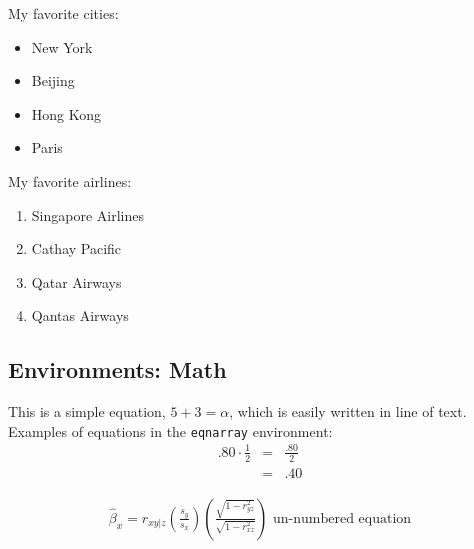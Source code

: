 \documentclass[10pt]{article}
\begin{document}
\noindent My favorite cities:
\begin{itemize}
\item New York
\item Beijing
\item Hong Kong
\item Paris
\end{itemize}

\noindent My favorite airlines:
\begin{enumerate}
\item Singapore Airlines
\item Cathay Pacific
\item Qatar Airways
\item Qantas Airways
\end{enumerate}

\subsection*{Environments: Math}

This is a simple equation, $5 + 3 = \alpha$, which is easily written in line of text. \\

\noindent Examples of equations in the {\tt eqnarray} environment:
\begin{eqnarray}
.80 \cdot \frac{1}{2} & = & \frac{.80}{2} \\
& = & .40
\end{eqnarray}

\begin{eqnarray*}
\hat{\beta}_x = r_{xy|z} \left(\frac{s_y}{s_x} \right) \left(\frac{\sqrt{1-r^2_{yz}}}{\sqrt{1-r^2_{xz}}} \right)
\mbox{ un-numbered equation}
\end{eqnarray*}
\end{document}
